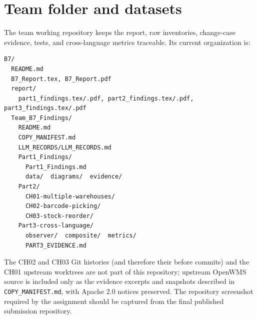 \documentclass[11pt,a4paper]{article}
\newcommand{\code}[1]{\nolinkurl{#1}}
\begin{document}
\section{Team folder and datasets}
The team working repository keeps the report, raw inventories, change-case evidence, tests, and cross-language metrics traceable. Its current organization is:
\begin{verbatim}
B7/
  README.md
  B7_Report.tex, B7_Report.pdf
  report/
    part1_findings.tex/.pdf, part2_findings.tex/.pdf, part3_findings.tex/.pdf
  Team_B7_Findings/
    README.md
    COPY_MANIFEST.md
    LLM_RECORDS/LLM_RECORDS.md
    Part1_Findings/
      Part1_Findings.md
      data/  diagrams/  evidence/
    Part2/
      CH01-multiple-warehouses/
      CH02-barcode-picking/
      CH03-stock-reorder/
    Part3-cross-language/
      observer/  composite/  metrics/
      PART3_EVIDENCE.md
\end{verbatim}
The CH02 and CH03 Git histories (and therefore their before commits) and the CH01 upstream worktrees are not part of this repository; upstream OpenWMS source is included only as the evidence excerpts and snapshots described in \code{COPY_MANIFEST.md}, with Apache 2.0 notices preserved. The repository screenshot required by the assignment should be captured from the final published submission repository.
\end{document}
